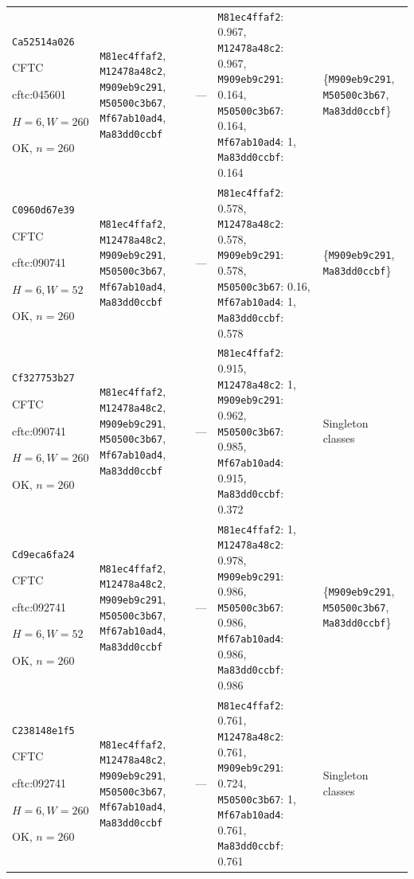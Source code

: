 \begin{longtable}{p{.15\linewidth}p{.17\linewidth}p{.17\linewidth}p{.25\linewidth}p{.14\linewidth}}
\texttt{Ca52514a026}\par CFTC\par cftc:045601\par $H=6,W=260$\par OK, $n=260$ & \texttt{M81ec4ffaf2}, \texttt{M12478a48c2}, \texttt{M909eb9c291}, \texttt{M50500c3b67}, \texttt{Mf67ab10ad4}, \texttt{Ma83dd0ccbf} & --- & \texttt{M81ec4ffaf2}: 0.967, \texttt{M12478a48c2}: 0.967, \texttt{M909eb9c291}: 0.164, \texttt{M50500c3b67}: 0.164, \texttt{Mf67ab10ad4}: 1, \texttt{Ma83dd0ccbf}: 0.164 & \{\texttt{M909eb9c291}, \texttt{M50500c3b67}, \texttt{Ma83dd0ccbf}\} \\
\texttt{C0960d67e39}\par CFTC\par cftc:090741\par $H=6,W=52$\par OK, $n=260$ & \texttt{M81ec4ffaf2}, \texttt{M12478a48c2}, \texttt{M909eb9c291}, \texttt{M50500c3b67}, \texttt{Mf67ab10ad4}, \texttt{Ma83dd0ccbf} & --- & \texttt{M81ec4ffaf2}: 0.578, \texttt{M12478a48c2}: 0.578, \texttt{M909eb9c291}: 0.578, \texttt{M50500c3b67}: 0.16, \texttt{Mf67ab10ad4}: 1, \texttt{Ma83dd0ccbf}: 0.578 & \{\texttt{M909eb9c291}, \texttt{Ma83dd0ccbf}\} \\
\texttt{Cf327753b27}\par CFTC\par cftc:090741\par $H=6,W=260$\par OK, $n=260$ & \texttt{M81ec4ffaf2}, \texttt{M12478a48c2}, \texttt{M909eb9c291}, \texttt{M50500c3b67}, \texttt{Mf67ab10ad4}, \texttt{Ma83dd0ccbf} & --- & \texttt{M81ec4ffaf2}: 0.915, \texttt{M12478a48c2}: 1, \texttt{M909eb9c291}: 0.962, \texttt{M50500c3b67}: 0.985, \texttt{Mf67ab10ad4}: 0.915, \texttt{Ma83dd0ccbf}: 0.372 & Singleton classes \\
\texttt{Cd9eca6fa24}\par CFTC\par cftc:092741\par $H=6,W=52$\par OK, $n=260$ & \texttt{M81ec4ffaf2}, \texttt{M12478a48c2}, \texttt{M909eb9c291}, \texttt{M50500c3b67}, \texttt{Mf67ab10ad4}, \texttt{Ma83dd0ccbf} & --- & \texttt{M81ec4ffaf2}: 1, \texttt{M12478a48c2}: 0.978, \texttt{M909eb9c291}: 0.986, \texttt{M50500c3b67}: 0.986, \texttt{Mf67ab10ad4}: 0.986, \texttt{Ma83dd0ccbf}: 0.986 & \{\texttt{M909eb9c291}, \texttt{M50500c3b67}, \texttt{Ma83dd0ccbf}\} \\
\texttt{C238148e1f5}\par CFTC\par cftc:092741\par $H=6,W=260$\par OK, $n=260$ & \texttt{M81ec4ffaf2}, \texttt{M12478a48c2}, \texttt{M909eb9c291}, \texttt{M50500c3b67}, \texttt{Mf67ab10ad4}, \texttt{Ma83dd0ccbf} & --- & \texttt{M81ec4ffaf2}: 0.761, \texttt{M12478a48c2}: 0.761, \texttt{M909eb9c291}: 0.724, \texttt{M50500c3b67}: 1, \texttt{Mf67ab10ad4}: 0.761, \texttt{Ma83dd0ccbf}: 0.761 & Singleton classes \\

\end{longtable}
